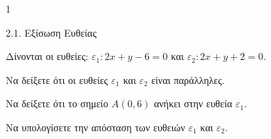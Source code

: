 \begin{ylh}{1}
    \item 2.1. Εξίσωση Ευθείας
\end{ylh}
Δίνονται οι ευθείες: $\varepsilon_1 : 2x+y-6=0$ και $\varepsilon_2 : 2x+y+2=0$.
\begin{alist}
\item Να δείξετε ότι οι ευθείες $\varepsilon_1$ και $\varepsilon_2$ είναι παράλληλες. 
\item
    \begin{rlist}
    \item Να δείξετε ότι το σημείο $A(0,6)$ ανήκει στην ευθεία $\varepsilon_1$. 
    \item Να υπολογίσετε την απόσταση των ευθειών $\varepsilon_1$ και $\varepsilon_2$. 
    \end{rlist}
\end{alist}